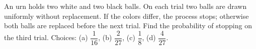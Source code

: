 An urn holds two white and two black balls. On each trial two balls are drawn uniformly without replacement. If the colors differ, the process stops; otherwise both balls are replaced before the next trial. Find the probability of stopping on the third trial. Choices: (a) $\dfrac{1}{16}$, (b) $\dfrac{2}{27}$, (c) $\dfrac{1}{8}$, (d) $\dfrac{4}{27}$.
